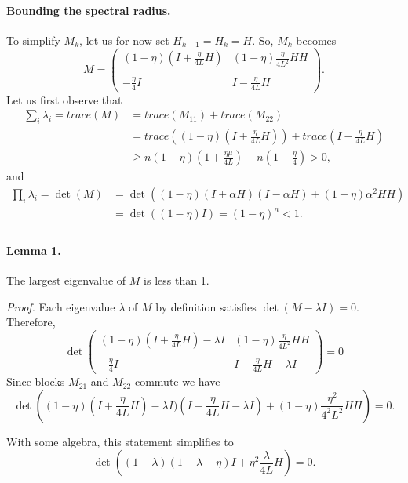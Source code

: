 \documentclass[11pt]{article}
\begin{document}
\paragraph{Bounding the spectral radius.}
To simplify $M_k$, let us for now set $\bar H_{k-1}=H_k=H$.  So, $M_k$ becomes
\[
M = \begin{pmatrix} (1-\eta)(I+\displaystyle\frac{\eta}{4L} H) & \displaystyle(1-\eta)\frac{\eta}{4L^2} HH\\ 
 \\
                   -\displaystyle\frac{\eta}{4}I  & I-\displaystyle\frac{\eta}{4L} H \end{pmatrix}.                  
\]
Let us first observe that 
\begin{align*}
\sum_i \lambda_i = trace(M) &= trace(M_{11})+trace(M_{22})\\
&=trace((1-\eta)(I+\frac{\eta}{4L} H))+trace(I-\frac{\eta}{4L} H)\\
&\geq n(1-\eta)(1+\frac{\eta\mu}{4L})+n(1-\frac{\eta}{4})>0,
\end{align*}
and
\begin{align*}
\prod_i \lambda_i = \det(M) &= \det\left((1-\eta)(I+\alpha H)(I-\alpha H) + (1-\eta)\alpha^2 HH\right)\\
&=\det\left((1-\eta)I\right) = (1-\eta)^n<1.\\
\end{align*}

\bigskip
\paragraph{Lemma 1.} The largest eigenvalue of $M$ is less than 1.  

\bigskip

\noindent
\textit{Proof.} Each eigenvalue $\lambda$ of $M$ by definition satisfies $\det(M-\lambda I)=0$.  Therefore,
\[
 \det \begin{pmatrix} (1-\eta)(I+\displaystyle\frac{\eta}{4L} H)-\lambda I & \displaystyle(1-\eta)\frac{\eta}{4L^2} HH\\ 
 \\
                   -\displaystyle\frac{\eta}{4}I  & I-\displaystyle\frac{\eta}{4L} H -\lambda I  \end{pmatrix}=0
\]
Since blocks $M_{21}$ and $M_{22}$ commute we have
\[
 \det\left((1-\eta)(I+\frac{\eta}{4L} H)-\lambda I)(I-\frac{\eta}{4L} H -\lambda I) + (1-\eta)\frac{\eta^2}{4^2L^2} HH \right)=0.
\]

With some algebra, this statement simplifies to 
\[
 \det\left((1-\lambda)(1-\lambda-\eta)I + \eta^2 \frac{\lambda}{4L}H \right)=0.
\]
\end{document}
